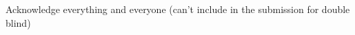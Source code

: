 \begin{acks}
    Acknowledge everything and everyone (can't include in the submission for double blind)
\end{acks}
